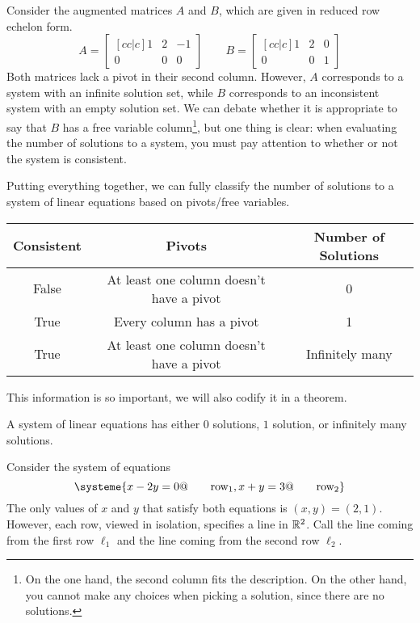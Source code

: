 	Consider the augmented matrices $A$ and $B$, which are given in reduced row echelon form.
	\[
		A=\begin{bmatrix}[cc|c]
			1&2&-1\\0&0&0
		\end{bmatrix}
		\qquad
		B=\begin{bmatrix}[cc|c]
			1&2&0\\0&0&1
		\end{bmatrix}
	\]
	Both matrices lack a pivot in their second column. However, $A$ corresponds to a system with an infinite solution
	set, while $B$ corresponds to an inconsistent system with an empty solution set. We can debate whether it is appropriate
	to say that $B$ has a free variable column\footnote{ On the one hand, the second column fits the description. On the other hand,
	you cannot make any choices when picking a solution, since there are no solutions.}, but one thing is clear:
	when evaluating the number of solutions to a system, you must pay attention to whether or not the system is consistent.


	Putting everything together, we can fully classify the number of solutions to a system of linear equations
	based on pivots/free variables.

	\begin{center}
		\begin{tabular}{ccc}
			Consistent & Pivots & Number of Solutions\\
			\hline
			False & At least one column doesn't have a pivot & 0\\
			True & Every column has a pivot & 1\\
			True & At least one column doesn't have a pivot & Infinitely many\\
		\end{tabular}
	\end{center}

	This information is so important, we will also codify it in a theorem.

	\begin{theorem}
		A system of linear equations has either $0$ solutions, $1$ solution, or infinitely many solutions.
	\end{theorem}
	

	Consider the system of equations
	\begin{equation}
		\label{EQINTERSECTINGLINES}
		\systeme{
			x-2y=0@\qquad\text{row}_1,
			x+y=3@\qquad\text{row}_2
		}
	\end{equation}
	The only values of $x$ and $y$ that satisfy both equations is
	$(x,y)=(2,1)$. However, each row, viewed in isolation, specifies a line in $\mathbb{R}^2$. Call the line
	coming from the first row $\ell_1$ and the line coming from the second row $\ell_2$.

